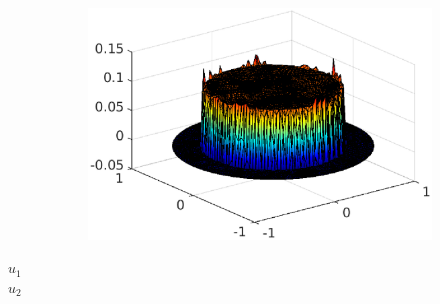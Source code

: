 \documentclass{beamer}
\begin{document}
\begin{frame}[t]
\begin{figure}[t]
\begin{subfigure}[normal]{0.46\textwidth}
\label{ref:position_membrane_convergence}
\end{subfigure}
\qquad
\begin{subfigure}[normal]{0.46\textwidth}
\includegraphics[width=\textwidth]{fig_article/fig_lambda_cv.eps}     
\label{ref:lambda_membrane_convergence} 
\end{subfigure}
\end{figure}
\vspace*{-4cm}\hspace*{0.95cm}$u_1$\\
\vspace*{0.7cm}\hspace*{0.85cm}$u_2$
\end{frame}
\end{document}
